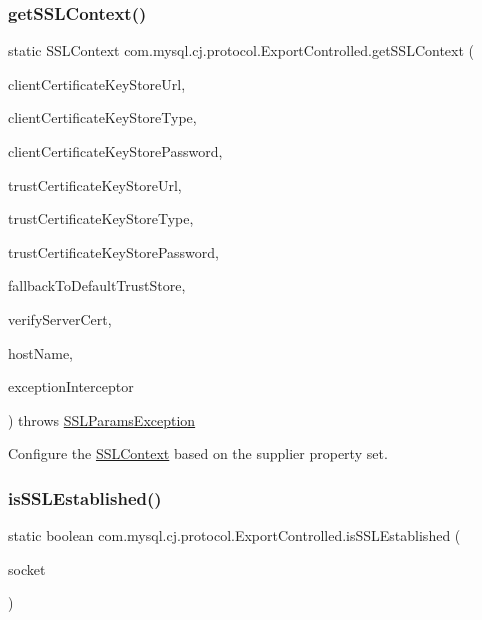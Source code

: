 \subsubsection{\texorpdfstring{get\+S\+S\+L\+Context()}{getSSLContext()}\hspace{0.1cm}{\footnotesize\ttfamily [2/2]}}
{\footnotesize\ttfamily static S\+S\+L\+Context com.\+mysql.\+cj.\+protocol.\+Export\+Controlled.\+get\+S\+S\+L\+Context (\begin{DoxyParamCaption}\item[{String}]{client\+Certificate\+Key\+Store\+Url,  }\item[{String}]{client\+Certificate\+Key\+Store\+Type,  }\item[{String}]{client\+Certificate\+Key\+Store\+Password,  }\item[{String}]{trust\+Certificate\+Key\+Store\+Url,  }\item[{String}]{trust\+Certificate\+Key\+Store\+Type,  }\item[{String}]{trust\+Certificate\+Key\+Store\+Password,  }\item[{boolean}]{fallback\+To\+Default\+Trust\+Store,  }\item[{boolean}]{verify\+Server\+Cert,  }\item[{String}]{host\+Name,  }\item[{\mbox{\hyperlink{interfacecom_1_1mysql_1_1cj_1_1exceptions_1_1_exception_interceptor}{Exception\+Interceptor}}}]{exception\+Interceptor }\end{DoxyParamCaption}) throws \mbox{\hyperlink{classcom_1_1mysql_1_1cj_1_1exceptions_1_1_s_s_l_params_exception}{S\+S\+L\+Params\+Exception}}\hspace{0.3cm}{\ttfamily [static]}}

Configure the \mbox{\hyperlink{}{S\+S\+L\+Context}} based on the supplier property set. \mbox{\label{classcom_1_1mysql_1_1cj_1_1protocol_1_1_export_controlled_a234adb48ad955b9c37b28dddaab9335d}} 
\subsubsection{\texorpdfstring{is\+S\+S\+L\+Established()}{isSSLEstablished()}}
{\footnotesize\ttfamily static boolean com.\+mysql.\+cj.\+protocol.\+Export\+Controlled.\+is\+S\+S\+L\+Established (\begin{DoxyParamCaption}\item[{Socket}]{socket }\end{DoxyParamCaption})\hspace{0.3cm}{\ttfamily [static]}}

